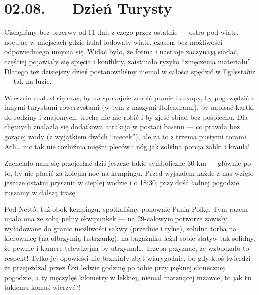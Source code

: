 \chapter*{02.08. --- Dzień Turysty}


Cisnęliśmy bez przerwy od 11 dni, z czego przez ostatnie --- ostro pod wiatr, nocując w miejscach gdzie hulał lodowaty wiatr, czasem bez możliwości odpowiedniego umycia się. Widać było, że forma i nastroje zaczynają siadać, częściej pojawiały się spięcia i konflikty, zaistniało ryzyko “zmęczenia materiału”. Dlatego też dzisiejszy dzień postanowiliśmy niemal w całości spędzić w Egilsstaðir --- tak na luzie.

Wreszcie znalazł się czas, by na spokojnie zrobić pranie i zakupy, by pogawędzić z innymi turystami-rowerzystami (w tym z naszymi Holendrami), by napisać kartki do rodziny i znajomych, trochę nic-nie-robić i by zjeść obiad bez pośpiechu. Dla chętnych znalazła się dodatkowa atrakcja w postaci basenu --- co prawda bez gorącej wody (z wyjątkiem dwóch “niecek”), ale za to z trzema pustymi torami. Ach… nic tak nie rozluźnia mięśni pleców i nóg jak solidna porcja żabki i kraula!


Zachciało nam się przejechać dziś jeszcze takie symboliczne 30 km --- głównie po to, by nie płacić za kolejną noc na kempingu. Przed wyjazdem każde z nas wzięło jeszcze ostatni prysznic w ciepłej wodzie i o 18:30, przy dość ładnej pogodzie, ruszamy w dalszą trasę.

Pod Nettó, tuż obok kempingu, spotkaliśmy ponownie Panią Polkę. Tym razem miała ona ze sobą pełny ekwipunkek --- na 29-calowym potworze zawisły wyładowane do granic możliwości sakwy (przednie i tylne), solidna torba na kierownicę (na olbrzymią lustrzankę), na bagażniku leżał sobie statyw tak solidny, że pewnie i kamerę telewizyjną by utrzymał… Trzeba przyznać, że wzbudzało to respekt! Tylko jej opowieści nie brzmiały zbyt wiarygodnie, bo gdy ktoś twierdzi że przejeżdżał przez Öxi ledwie godzinę po tobie przy pięknej słonecznej pogodzie, a ty męczyłęś kilometry w lekkiej, niemal marznącej mżawce, to jak tu takiemu komuś wierzyć?!

